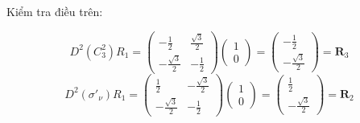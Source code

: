 \documentclass{article}
\begin{document}
Kiểm tra điều trên:

\[
	\renewcommand{\arraystretch}{0.75}
	D^2\left(C_3^2\right)R_1 =
	\begin{pmatrix}
		-\frac{1}{2}        & \frac{\sqrt{3}}{2} \\
		-\frac{\sqrt{3}}{2} & -\frac{1}{2}
	\end{pmatrix}
	\begin{pmatrix}
		1 \\
		0
	\end{pmatrix}
	=
	\begin{pmatrix}
		-\frac{1}{2} \\
		-\frac{\sqrt{3}}{2}
	\end{pmatrix}
	= \textbf{R}_3
\]
\[
	\renewcommand{\arraystretch}{0.75}
	D^2\left(\sigma'_\nu\right)R_1 =
	\begin{pmatrix}
		\frac{1}{2}         & -\frac{\sqrt{3}}{2} \\
		-\frac{\sqrt{3}}{2} & -\frac{1}{2}
	\end{pmatrix}
	\begin{pmatrix}
		1 \\
		0
	\end{pmatrix}
	=
	\begin{pmatrix}
		\frac{1}{2} \\
		-\frac{\sqrt{3}}{2}
	\end{pmatrix}
	= \textbf{R}_2
\]
\end{document}
